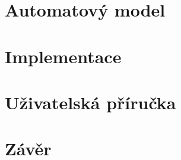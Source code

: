 \documentclass[12pt]{report}
\begin{document}
	\chapter{Automatový model}
	
	\chapter{Implementace}
	
	\chapter{Uživatelská příručka}
	
	\chapter{Závěr}
	
\end{document}
